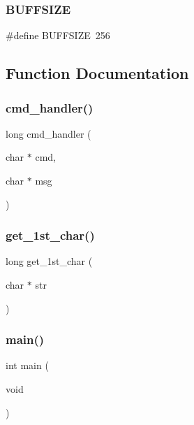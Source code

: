 \subsubsection{B\+U\+F\+F\+S\+I\+ZE}
{\footnotesize\ttfamily \#define B\+U\+F\+F\+S\+I\+ZE~256}



\subsection{Function Documentation}
\mbox{\label{prueba_8c_a9fab57195d50c5f2b55f2744232ad64d}} 
\subsubsection{cmd\+\_\+handler()}
{\footnotesize\ttfamily long cmd\+\_\+handler (\begin{DoxyParamCaption}\item[{char $\ast$}]{cmd,  }\item[{char $\ast$}]{msg }\end{DoxyParamCaption})}

\mbox{\label{prueba_8c_a224345045f1250d5768d42d8cc9e3dab}} 
\subsubsection{get\+\_\+1st\+\_\+char()}
{\footnotesize\ttfamily long get\+\_\+1st\+\_\+char (\begin{DoxyParamCaption}\item[{char $\ast$}]{str }\end{DoxyParamCaption})}

\mbox{\label{prueba_8c_ae66f6b31b5ad750f1fe042a706a4e3d4}} 
\subsubsection{main()}
{\footnotesize\ttfamily int main (\begin{DoxyParamCaption}\item[{void}]{ }\end{DoxyParamCaption})}

